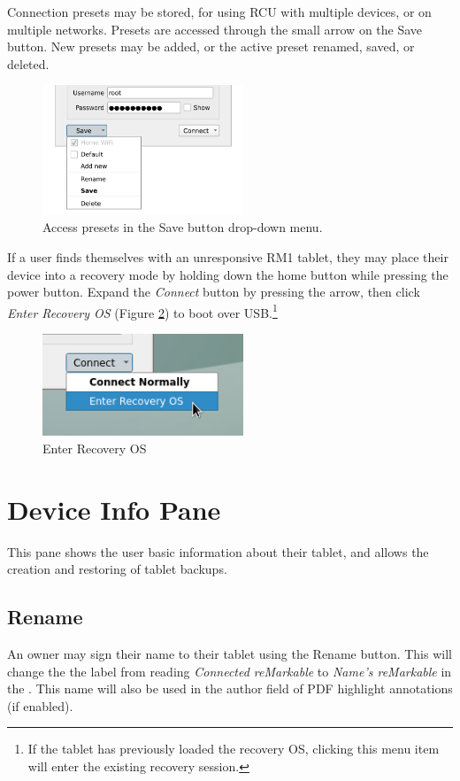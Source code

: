 \documentclass{memoir}
\begin{document}
{Connection presets may be stored, for using RCU with multiple devices, or on multiple networks. Presets are accessed through the small arrow on the Save button. New presets may be added, or the active preset renamed, saved, or deleted.

\begin{figure}[h]
  \centering
  \includegraphics[width=6cm]{images/connection-presets.png}
  \caption{Access presets in the Save button drop-down menu.}
  \label{fig:cxpresets}
\end{figure}



\newpage
If a user finds themselves with an unresponsive RM1 tablet, they may place their device into a recovery mode by holding down the home button while pressing the power button. Expand the \textit{Connect} button by pressing the arrow, then click \textit{Enter Recovery OS} (Figure \ref{fig:recoveryos}) to boot over USB.\footnote{If the tablet has previously loaded the recovery OS, clicking this menu item will enter the existing recovery session.}

\begin{figure}[h]
  \centering
  \includegraphics[width=6cm]{images/recoveryos.png}
  \caption{Enter Recovery OS}
  \label{fig:recoveryos}
\end{figure}



\newpage
\section{Device Info Pane}
\label{sec:deviceinfo}
This pane shows the user basic information about their tablet, and allows the creation and restoring of tablet backups.

\subsection{Rename}
An owner may sign their name to their tablet using the Rename button. This will change the the label from reading \textit{Connected reMarkable} to \textit{Name's reMarkable} in the . This name will also be used in the author field of PDF highlight annotations (if enabled).

}
\end{document}
